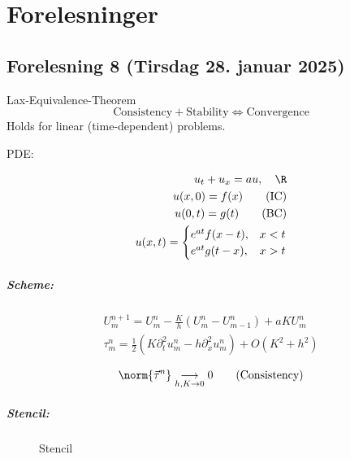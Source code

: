 \chapter{Forelesninger}
\sloppy

\section{Forelesning 8 (Tirsdag 28. januar 2025)}

\begin{theorem}{Lax-Equivalence-Theorem}{}
  \[
    \text{Consistency} + \text{Stability} \iff \text{Convergence}
  \]
  Holds for linear (time-dependent) problems.
\end{theorem}

PDE:

\begin{align*}
  u_t + u_x  = au, \quad \R \\
  u(x, 0) = f(x) \tag{IC}   \\
  u(0, t) = g(t) \tag{BC}   \\
  u(x,t) =
  \begin{cases}
    e^{at}f(x-t), & x < t \\
    e^{at}g(t-x), & x > t
  \end{cases}
\end{align*}

\paragraph{Scheme:}
\begin{align*}
  U_m^{n+1} = U_m^n - \frac{K}{h}(U_m^n - U_{m-1}^n) + aKU_m^n \\
  \tau_m^n = \frac{1}{2}(K\partial_t^2 u_m^n - h\partial_x^2 u_m^n) + O(K^2 + h^2)
\end{align*}

\[
  \norm{\vec{\tau}^n} \underset{h, K \to 0}{\longrightarrow} 0 \tag{Consistency}
\]

\paragraph{Stencil:}
\begin{figure}[H]
  \centering
  \caption{Stencil}
  \label{fig:stencil}
\end{figure}

